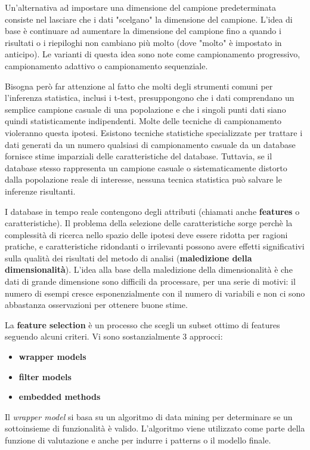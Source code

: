 \documentclass[a4paper]{extarticle}
\begin{document}
Un'alternativa ad impostare una dimensione del campione predeterminata consiste nel lasciare che i dati "scelgano" la dimensione del campione. L'idea di base è continuare ad aumentare la dimensione del campione fino a quando i risultati o i riepiloghi non cambiano più molto (dove "molto" è impostato in anticipo). Le varianti di questa idea sono note come campionamento progressivo, campionamento adattivo o campionamento sequenziale.

Bisogna però far attenzione al fatto che molti degli strumenti comuni per l'inferenza statistica, inclusi i t-test, presuppongono che i dati comprendano un semplice campione casuale di una popolazione e che i singoli punti dati siano quindi statisticamente indipendenti. Molte delle tecniche di campionamento violeranno questa ipotesi. Esistono tecniche statistiche specializzate per trattare i dati generati da un numero qualsiasi di  campionamento casuale da un database fornisce stime imparziali delle caratteristiche del database. Tuttavia, se il database stesso rappresenta un campione casuale o sistematicamente distorto dalla popolazione reale di interesse, nessuna tecnica statistica può salvare le inferenze risultanti.

I database in tempo reale contengono degli attributi (chiamati anche \textbf{features} o caratteristiche). Il problema della selezione delle caratteristiche sorge perchè la complessità di ricerca nello spazio delle ipotesi deve essere ridotta per ragioni pratiche, e caratteristiche ridondanti o irrilevanti possono avere effetti significativi sulla qualità dei risultati del metodo di analisi (\textbf{maledizione della dimensionalità}). L'idea alla base della maledizione della dimensionalità è che dati di grande dimensione sono difficili da processare, per una serie di motivi: il numero di esempi cresce esponenzialmente con il numero di variabili e non ci sono abbastanza osservazioni per ottenere buone stime.

La \textbf{feature selection} è un processo che scegli un subset ottimo di features seguendo alcuni criteri. Vi sono sostanzialmente 3 approcci:
\begin{itemize}
\item \textbf{wrapper models}
\item \textbf{filter models}
\item \textbf{embedded methods}
\end{itemize}

Il \textit{wrapper model} si basa su un algoritmo di data mining per determinare se un sottoinsieme di funzionalità è valido. L'algoritmo viene utilizzato come parte della funzione di valutazione e anche per indurre i patterns o il modello finale. 
\end{document}
